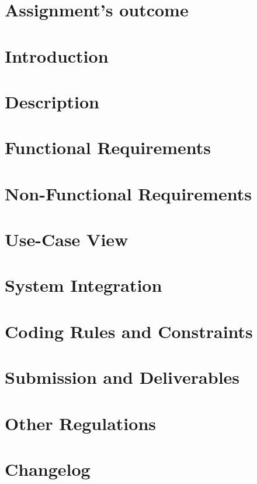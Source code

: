 \documentclass[12pt,a4paper]{article}
\begin{document}
\section{Assignment's outcome}


\section{Introduction}


\section{Description}


\section{Functional Requirements}


\section{Non-Functional Requirements}


\section{Use-Case View}


\section{System Integration}


\section{Coding Rules and Constraints}


\section{Submission and Deliverables}


\section{Other Regulations}


\section{Changelog}

\end{document}

